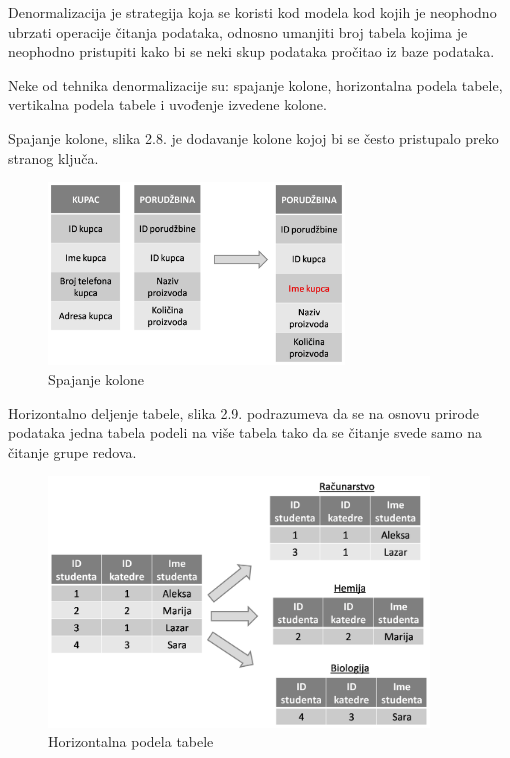 \documentclass[12pt,oneside]{memoir}
\begin{document}
Denormalizacija je strategija koja se koristi kod modela kod kojih je neophodno ubrzati operacije čitanja podataka, odnosno umanjiti broj tabela kojima je neophodno pristupiti kako bi se neki skup podataka pročitao iz baze podataka.  

Neke od tehnika denormalizacije su:  spajanje kolone, horizontalna podela tabele, vertikalna podela tabele i uvođenje izvedene kolone. 

Spajanje kolone, slika 2.8. je dodavanje kolone kojoj bi se često pristupalo preko stranog ključa.

\begin{figure}[!ht]
  \centering
  \includegraphics[width=0.7\textwidth]{denormalizacija.png}
  \caption{Spajanje kolone}
  \label{fig:grafikon}
\end{figure}

Horizontalno deljenje tabele, slika 2.9. podrazumeva da se na osnovu prirode podataka jedna tabela podeli na više tabela tako da se čitanje svede samo na čitanje grupe redova. 

\begin{figure}[!ht]
  \centering
  \includegraphics[width=0.9\textwidth]{denormalizacija2.png}
  \caption{Horizontalna podela tabele}
  \label{fig:grafikon}
\end{figure}
\end{document}
